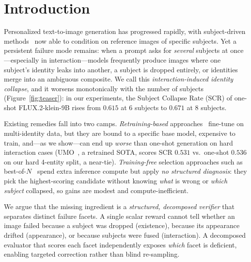 \documentclass[letterpaper]{article}
\begin{document}
\section{Introduction}

Personalized text-to-image generation has progressed rapidly, with subject-driven methods~\citep{gal2022image,ruiz2023dreambooth,kumari2023multi,ye2023ip} now able to condition on reference images of specific subjects. Yet a persistent failure mode remains: when a prompt asks for \emph{several} subjects at once---especially in interaction---models frequently produce images where one subject's identity leaks into another, a subject is dropped entirely, or identities merge into an ambiguous composite. We call this \emph{interaction-induced identity collapse}, and it worsens monotonically with the number of subjects (Figure~\ref{fig:teaser}): in our experiments, the Subject Collapse Rate (SCR) of one-shot FLUX.2-klein-9B rises from $0.615$ at 6 subjects to $0.671$ at 8 subjects.


Existing remedies fall into two camps. \emph{Retraining-based} approaches~\citep{she2025mosaic,chen2025xverse,wang2025psr,he2024uniportrait} fine-tune on multi-identity data, but they are bound to a specific base model, expensive to train, and---as we show---can end up \emph{worse} than one-shot generation on hard interaction cases (UMO~\citep{cheng2025umo}, a retrained SOTA, scores SCR $0.531$ vs.\ one-shot $0.536$ on our hard 4-entity split, a near-tie). \emph{Training-free} selection approaches such as best-of-$N$~\citep{snell2024testtime} spend extra inference compute but apply \emph{no structured diagnosis}: they pick the highest-scoring candidate without knowing \emph{what} is wrong or \emph{which subject} collapsed, so gains are modest and compute-inefficient.

We argue that the missing ingredient is a \emph{structured, decomposed verifier} that separates distinct failure facets. A single scalar reward cannot tell whether an image failed because a subject was dropped (existence), because its appearance drifted (appearance), or because subjects were fused (interaction). A decomposed evaluator that scores each facet independently exposes \emph{which} facet is deficient, enabling targeted correction rather than blind re-sampling.
\end{document}

